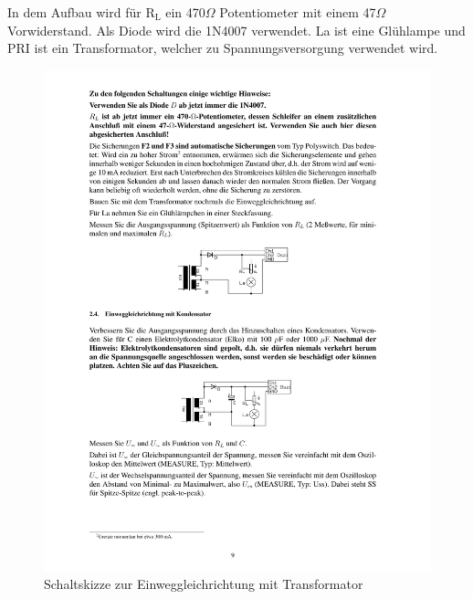 \documentclass[12pt,a4paper]{article}
\begin{document}
In dem Aufbau wird für R$_\text{L}$ ein 470$\Omega$ Potentiometer mit einem 47$\Omega$ Vorwiderstand. Als Diode wird die 1N4007 verwendet. La ist eine Glühlampe und PRI ist ein Transformator, welcher zu Spannungsversorgung verwendet wird.

\begin{figure}[H] 
  \centering
    \includegraphics[trim = 10mm 150mm 10mm 95mm, clip, scale = 1]{ep2_14[Page9].pdf}
  	\caption[Schaltskizze zur Einweggleichrichtung mit Transformator]{Schaltskizze zur Einweggleichrichtung mit Transformator\footnotemark}
  \label{fig:2_4}
\end{figure}
\end{document}
